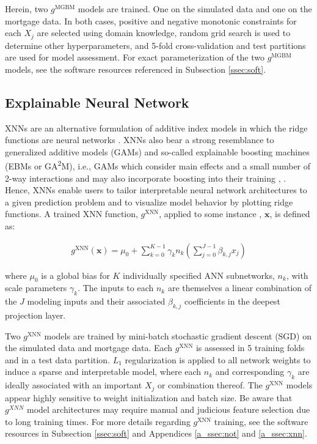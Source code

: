 \documentclass[information,article,submit,moreauthors,pdftex]{definitions/mdpi}
\begin{document}
Herein, two $g^\text{MGBM}$ models are trained. One on the simulated data and one on the mortgage data. In both cases, positive and negative monotonic constraints for each $X_j$ are selected using domain knowledge, random grid search is used to determine other hyperparameters, and 5-fold cross-validation and test partitions are used for model assessment. For exact parameterization of the two $g^\text{MGBM}$ models, see the software resources referenced in Subsection \ref{ssec:soft}. 

\subsection{Explainable Neural Network}\label{ssec:xnn}

XNNs are an alternative formulation of additive index models in which the ridge functions are neural networks \cite{wf_xnn}. XNNs also bear a strong resemblance to generalized additive models (GAMs) and so-called explainable boosting machines (EBMs or GA\textsuperscript{2}M), i.e., GAMs which consider main effects and a small number of 2-way interactions and may also incorporate boosting into their training \cite{esl}, \cite{ga2m}.  Hence, XNNs enable users to tailor interpretable neural network architectures to a given prediction problem and to visualize model behavior by plotting ridge functions. A trained XNN function, $g^{\text{XNN}}$, applied to some instance , $\mathbf{x}$, is defined as:

\begin{equation}
\begin{aligned}
\label{eq:xnn}
g^{\text{XNN}}(\mathbf{x}) = \mu_0 + \sum_{k=0}^{K-1}\gamma_k n_k(\sum^{J-1}_{j=0}\beta_{k, j}x_j)
\end{aligned}
\end{equation}

\noindent where $\mu_0$ is a global bias for $K$ individually specified ANN subnetworks, $n_k$, with scale parameters $\gamma_k$. The inputs to each $n_k$ are themselves a linear combination of the $J$ modeling inputs and their associated $\beta_{k,j}$ coefficients in the deepest projection layer. 

Two $g^\text{XNN}$ models are trained by mini-batch stochastic gradient descent (SGD) on the simulated data and mortgage data. Each $g^\text{XNN}$ is assessed in 5 training folds and in a test data partition. $L_1$ regularization is applied to all network weights to induce a sparse and interpretable model, where each $n_k$ and corresponding $\gamma_k$ are ideally associated with an important $X_j$ or combination thereof. The $g^\text{XNN}$ models appear highly sensitive to weight initialization and batch size. Be aware that $g^{XNN}$ model architectures may require manual and judicious feature selection due to long training times. For more details regarding $g^\text{XNN}$ training, see the software resources in Subsection \ref{ssec:soft} and Appendices  \ref{a_ssec:not} and \ref{a_ssec:xnn}.
\end{document}
